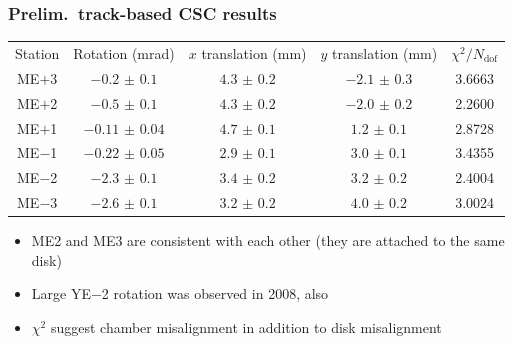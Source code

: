 \documentclass[compress]{beamer}
\begin{document}
\begin{frame}
\frametitle{Prelim.\ track-based CSC results}

\renewcommand{\arraystretch}{1.2}
\begin{tabular}{c c c c c}
\scriptsize Station & \scriptsize Rotation (mrad) & \scriptsize $x$ translation (mm) & \scriptsize $y$ translation (mm) & \scriptsize $\chi^2/N_{\mbox{dof}}$ \\
\scriptsize ME$+$3 & \scriptsize $-0.2$ $\pm$ $ 0.1$ & \scriptsize $ 4.3$ $\pm$ $ 0.2$ & \scriptsize $-2.1$ $\pm$ $ 0.3$ & \scriptsize 3.6663 \\
\scriptsize ME$+$2 & \scriptsize $-0.5$ $\pm$ $ 0.1$ & \scriptsize $ 4.3$ $\pm$ $ 0.2$ & \scriptsize $-2.0$ $\pm$ $ 0.2$ & \scriptsize 2.2600 \\
\scriptsize ME$+$1 & \scriptsize $-0.11$ $\pm$ $ 0.04$ & \scriptsize $ 4.7$ $\pm$ $ 0.1$ & \scriptsize $ 1.2$ $\pm$ $ 0.1$ & \scriptsize 2.8728 \\
\scriptsize ME$-$1 & \scriptsize $-0.22$ $\pm$ $ 0.05$ & \scriptsize $ 2.9$ $\pm$ $ 0.1$ & \scriptsize $ 3.0$ $\pm$ $ 0.1$ & \scriptsize 3.4355 \\
\scriptsize ME$-$2 & \scriptsize $-2.3$ $\pm$ $ 0.1$ & \scriptsize $ 3.4$ $\pm$ $ 0.2$ & \scriptsize $ 3.2$ $\pm$ $ 0.2$ & \scriptsize 2.4004 \\
\scriptsize ME$-$3 & \scriptsize $-2.6$ $\pm$ $ 0.1$ & \scriptsize $ 3.2$ $\pm$ $ 0.2$ & \scriptsize $ 4.0$ $\pm$ $ 0.2$ & \scriptsize 3.0024 \\
\end{tabular}

\vfill
\begin{itemize}
\item ME2 and ME3 are consistent with each other (they are attached to the same disk)
\item Large YE$-$2 rotation was observed in 2008, also
\item $\chi^2$ suggest chamber misalignment in addition to disk misalignment
\end{itemize}
\end{frame}
\end{document}

